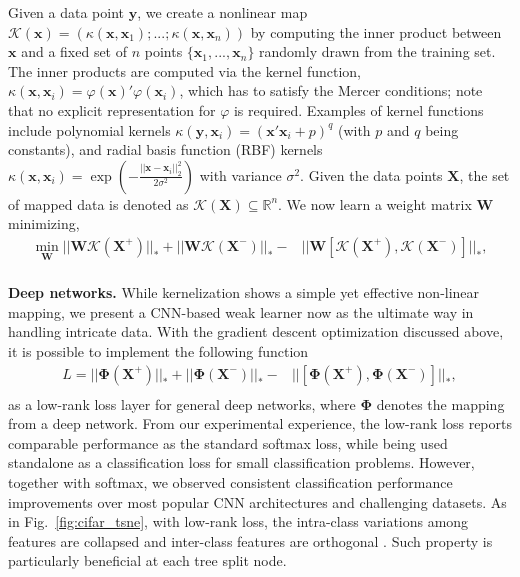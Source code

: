 \documentclass[runningheads]{llncs}
\begin{document}
Given a data point $\mathbf{y}$, we create a nonlinear map
$\mathcal{K}(\mathbf{x}) = (\kappa(\mathbf{x}, \mathbf{x}_1); ...;
\kappa(\mathbf{x}, \mathbf{x}_n))$ by computing the inner product between
$\mathbf{x}$ and a fixed set of $n$ points $\{\mathbf{x}_1, ..., \mathbf{x}_n\}$
randomly drawn from the training set. The inner products are computed via the
kernel function, $\kappa(\mathbf{x}, \mathbf{x}_i) = \varphi(\mathbf{x})'
\varphi(\mathbf{x}_i)$, which has to satisfy the Mercer conditions; note that no
explicit representation for $\varphi$ is required. Examples of kernel functions
include polynomial kernels $\kappa(\mathbf{y}, \mathbf{x}_i) =
(\mathbf{x}'\mathbf{x}_i+p)^q$ (with $p$ and $q$ being constants), and radial
basis function (RBF) kernels $\kappa(\mathbf{x}, \mathbf{x}_i) = \exp
(-\frac{||\mathbf{x}-\mathbf{x}_i||_2^2}{2\sigma^2})$ with variance $\sigma^2$.
Given the data points $\mathbf{X}$, the set of mapped data is denoted as
$\mathcal{K}(\mathbf{X}) \subseteq \mathbb{R}^n$.  We now learn a weight matrix
$\mathbf{W}$ minimizing,
\begin{align} \label{knuclear_obj} \nonumber
\underset{\mathbf{W}}  \min ||\mathbf{W} \mathcal{K}(\mathbf{X}^+)||_* + ||\mathbf{W} \mathcal{K}(\mathbf{X}^-)||_* -& ||\mathbf{W} [\mathcal{K}(\mathbf{X}^+), \mathcal{K}(\mathbf{X}^-)]||_*, \\
\end{align}

\textbf{Deep networks.}  While kernelization shows a simple yet effective
non-linear mapping, we present a CNN-based weak learner now as the ultimate way in handling intricate
data.  With the gradient descent optimization discussed above, it is
possible to implement the following function
\begin{align} \label{lowrank-loss} \nonumber
L = ||\mathbf{\Phi}(\mathbf{X}^+)||_* + ||\mathbf{\Phi}(\mathbf{X}^-)||_* -& ||[\mathbf{\Phi}(\mathbf{X}^+), \mathbf{\Phi}(\mathbf{X}^-)]||_*, \\
\end{align}
as a low-rank loss layer for general deep networks, where $\mathbf{\Phi}$
denotes the mapping from a deep network.  From our
experimental experience, the low-rank loss reports comparable performance as the
standard softmax loss, while being used standalone as a classification loss for
small classification problems. However, together with softmax, we observed
consistent classification performance improvements over most popular CNN
architectures and challenging datasets. As in Fig.~\ref{fig:cifar_tsne}, with low-rank
loss, the intra-class variations among features are collapsed and inter-class
features are orthogonal \cite{Lezama2018OLE}. Such property is particularly beneficial at each tree
split node.
\end{document}
